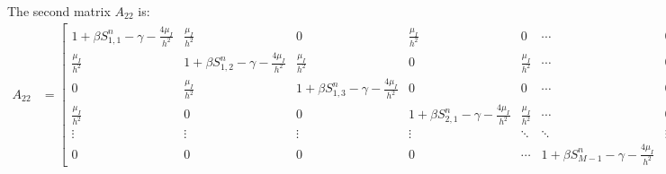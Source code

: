 The second matrix \(A_{22}\) is:
\begin{align*}
  A_{22} & = \scriptscriptstyle
  \begin{bmatrix}
    1 + \beta S_{1,1}^n - \gamma - \tfrac{4\mu_I}{h^2} & \tfrac{\mu_I}{h^2}                                 & 0                                                  & \tfrac{\mu_I}{h^2}                                 & 0                  & \cdots                                             & 0      \\
    \tfrac{\mu_I}{h^2}                                 & 1 + \beta S_{1,2}^n - \gamma - \tfrac{4\mu_I}{h^2} & \tfrac{\mu_I}{h^2}                                 & 0                                                  & \tfrac{\mu_I}{h^2} & \cdots                                             & 0      \\
    0                                                  & \tfrac{\mu_I}{h^2}                                 & 1 + \beta S_{1,3}^n - \gamma - \tfrac{4\mu_I}{h^2} & 0                                                  & 0                  & \cdots                                             & 0      \\
    \tfrac{\mu_I}{h^2}                                 & 0                                                  & 0                                                  & 1 + \beta S_{2,1}^n - \gamma - \tfrac{4\mu_I}{h^2} & \tfrac{\mu_I}{h^2} & \cdots                                             & 0      \\
    \vdots                                             & \vdots                                             & \vdots                                             & \vdots                                             & \ddots             & \ddots                                             & \vdots \\
    0                                                  & 0                                                  & 0                                                  & 0                                                  & \cdots             & 1 + \beta S_{M-1}^n - \gamma - \tfrac{4\mu_I}{h^2}
  \end{bmatrix}
\end{align*}

